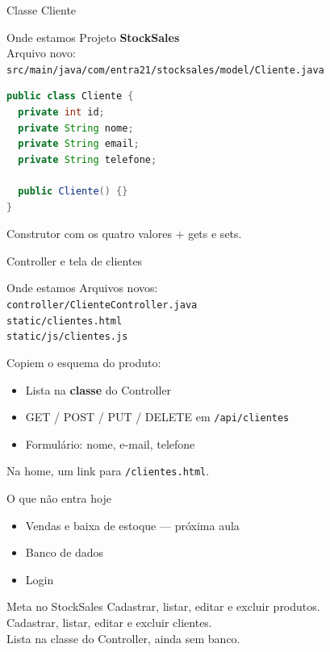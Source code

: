 \documentclass[aspectratio=169,11pt]{beamer}
\newcommand{\onde}[1]{%
  \begin{block}{Onde estamos}
    #1
  \end{block}
}
\begin{document}
\begin{frame}[fragile]{Classe Cliente}
  \onde{Projeto \textbf{StockSales}\\
        Arquivo novo:\\
        \texttt{src/main/java/com/entra21/stocksales/model/Cliente.java}}

\begin{lstlisting}[language=Java,basicstyle=\ttfamily\footnotesize]
public class Cliente {
  private int id;
  private String nome;
  private String email;
  private String telefone;

  public Cliente() {}
}
\end{lstlisting}

  Construtor com os quatro valores + gets e sets.
\end{frame}

\begin{frame}{Controller e tela de clientes}
  \onde{Arquivos novos:\\
        \texttt{controller/ClienteController.java}\\
        \texttt{static/clientes.html}\\
        \texttt{static/js/clientes.js}}

  Copiem o esquema do produto:
  \begin{itemize}
    \item Lista na \textbf{classe} do Controller
    \item GET / POST / PUT / DELETE em \texttt{/api/clientes}
    \item Formulário: nome, e-mail, telefone
  \end{itemize}

  \vspace{0.4em}
  Na home, um link para \texttt{/clientes.html}.
\end{frame}

\begin{frame}{O que não entra hoje}
  \begin{itemize}
    \item Vendas e baixa de estoque --- próxima aula
    \item Banco de dados
    \item Login
  \end{itemize}

  \vspace{0.5em}
  \begin{block}{Meta no StockSales}
    Cadastrar, listar, editar e excluir produtos.\\
    Cadastrar, listar, editar e excluir clientes.\\
    Lista na classe do Controller, ainda sem banco.
  \end{block}
\end{frame}
\end{document}
